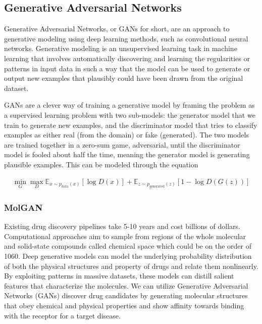 \documentclass{scrartcl}
\begin{document}
\subsection{Generative Adversarial Networks}
\label{sec:org8f70103}

Generative Adversarial Networks, or GANs for short, are an approach to generative modeling using deep learning methods, such as convolutional neural networks. Generative modeling is an unsupervised learning task in machine learning that involves automatically discovering and learning the regularities or patterns in input data in such a way that the model can be used to generate or output new examples that plausibly could have been drawn from the original dataset.

GANs are a clever way of training a generative model by framing the problem as a supervised learning problem with two sub-models: the generator model that we train to generate new examples, and the discriminator model that tries to classify examples as either real (from the domain) or fake (generated). The two models are trained together in a zero-sum game, adversarial, until the discriminator model is fooled about half the time, meaning the generator model is generating plausible examples. This can be modeled through the equation

\begin{align}
\min_{G}\max_{D}\mathbb{E}_{x\sim p_{\text{data}}(x)}[\log{D(x)}] +  \mathbb{E}_{z\sim p_{\text{generated}}(z)}[1 - \log{D(G(z))}]
\end{align}

\subsubsection{MolGAN}
\label{sec:orgce38a3d}

Existing drug discovery pipelines take 5-10 years and cost billions of dollars. Computational approaches aim to sample from regions of the whole molecular and solid-state compounds called chemical space which could be on the order of 1060. Deep generative models can model the underlying probability distribution of both the physical structures and property of drugs and relate them nonlinearly. By exploiting patterns in massive datasets, these models can distill salient features that characterize the molecules. We can utilize Generative Adversarial Networks (GANs) discover drug candidates by generating molecular structures that obey chemical and physical properties and show affinity towards binding with the receptor for a target disease.
\end{document}
